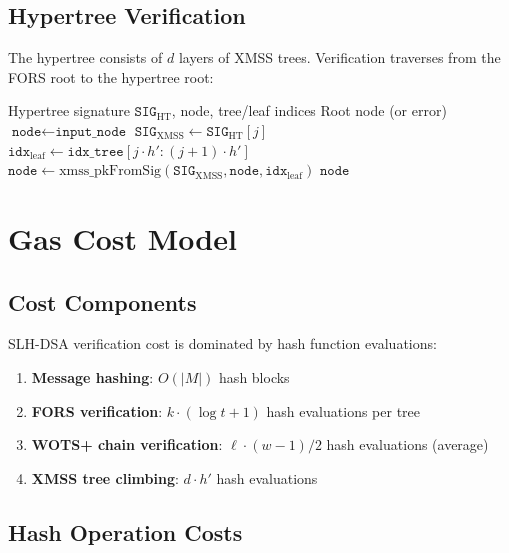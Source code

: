 \documentclass[11pt,a4paper]{article}
\begin{document}
\subsection{Hypertree Verification}

The hypertree consists of $d$ layers of XMSS trees. Verification traverses from the FORS root to the hypertree root:

\begin{algorithm}
\caption{ht\_verify}
\label{alg:ht}
\begin{algorithmic}[1]
\Require Hypertree signature $\texttt{SIG}_{\text{HT}}$, node, tree/leaf indices
\Ensure Root node (or error)
\State $\texttt{node} \gets \texttt{input\_node}$
    \State $\texttt{SIG}_{\text{XMSS}} \gets \texttt{SIG}_{\text{HT}}[j]$
    \State $\texttt{idx}_{\text{leaf}} \gets \texttt{idx\_tree}[j \cdot h' : (j+1) \cdot h']$
    \State $\texttt{node} \gets \text{xmss\_pkFromSig}(\texttt{SIG}_{\text{XMSS}}, \texttt{node}, \texttt{idx}_{\text{leaf}})$
\EndFor
\Return $\texttt{node}$
\end{algorithmic}
\end{algorithm}

\section{Gas Cost Model}

\subsection{Cost Components}

SLH-DSA verification cost is dominated by hash function evaluations:

\begin{enumerate}
    \item \textbf{Message hashing}: $O(|M|)$ hash blocks
    \item \textbf{FORS verification}: $k \cdot (\log t + 1)$ hash evaluations per tree
    \item \textbf{WOTS+ chain verification}: $\ell \cdot (w-1)/2$ hash evaluations (average)
    \item \textbf{XMSS tree climbing}: $d \cdot h'$ hash evaluations
\end{enumerate}

\subsection{Hash Operation Costs}
\end{document}
